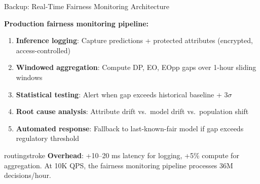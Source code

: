 \documentclass[aspectratio=169, 12pt]{beamer}
\begin{document}
\begin{frame}{Backup: Real-Time Fairness Monitoring Architecture}

\footnotesize
\textbf{Production fairness monitoring pipeline:}

\vspace{0.1cm}
\begin{enumerate}\setlength\itemsep{1pt}
  \item \textbf{Inference logging}: Capture predictions + protected attributes (encrypted, access-controlled)
  \item \textbf{Windowed aggregation}: Compute DP, EO, EOpp gaps over 1-hour sliding windows
  \item \textbf{Statistical testing}: Alert when gap exceeds historical baseline + 3$\sigma$
  \item \textbf{Root cause analysis}: Attribute drift vs.\ model drift vs.\ population shift
  \item \textbf{Automated response}: Fallback to last-known-fair model if gap exceeds regulatory threshold
\end{enumerate}

\vspace{0.1cm}
\begin{mlsyscard}{routingstroke}
{\footnotesize \textbf{Overhead}: +10--20 ms latency for logging, +5\% compute for aggregation. At 10K QPS, the fairness monitoring pipeline processes 36M decisions/hour.}
\end{mlsyscard}

\end{frame}
\end{document}

